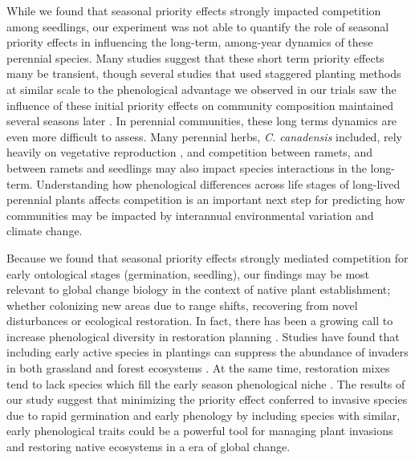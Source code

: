\documentclass{article}[11pt]
\begin{document}
{While we found that seasonal priority effects strongly impacted competition among seedlings, our experiment was not able to quantify the role of seasonal priority effects in influencing the long-term, among-year dynamics of these perennial species. %
Many studies suggest that these short term priority effects many be transient, though several studies that used staggered planting methods at similar scale to the phenological advantage we observed in our trials saw the influence of these initial priority effects on community composition maintained several seasons later \citep{Vaughn:2015wp,Young:2017aa,Torrez:2017to}. In perennial communities, these long terms dynamics are even more difficult to assess. Many perennial herbs, \textit{C. canadensis} included, rely heavily on vegetative reproduction \citep{Hawkins:2005ve}, and competition between ramets, and between ramets and seedlings may also impact species interactions in the long-term. %
Understanding how phenological differences across life stages of long-lived perennial plants affects competition is an important next step for predicting how communities may be impacted by interannual environmental variation and climate change.

Because we found that seasonal priority effects strongly mediated competition for early ontological stages (germination, seedling), our findings may be most relevant to global change biology in the context of native plant establishment; whether colonizing new areas due to range shifts, recovering from novel disturbances or ecological restoration. In fact, there has been a growing call to increase phenological diversity in restoration planning \citep{Hess:2019vn}. Studies have found that including early active species in plantings can suppress the abundance of invaders in both grassland \citep{Cleland:2013wo} and forest ecosystems \citep{Schuster:2020ww}. At the same time, restoration mixes tend to lack species which fill the early season phenological niche \citep{Havens:2016vo}. The results of our study suggest that minimizing the priority effect conferred to invasive species due to rapid germination and early phenology by including species with similar, early phenological traits could be a powerful tool for managing plant invasions and restoring native ecosystems in a era of global change.

}
\end{document}
